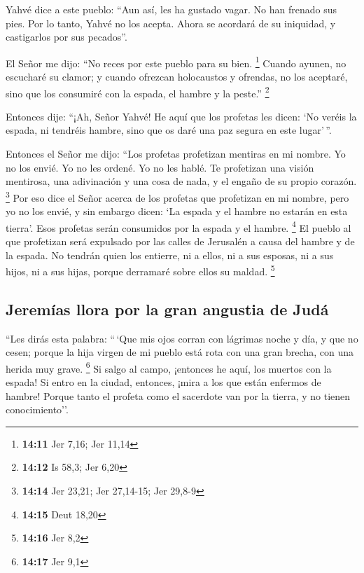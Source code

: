  Yahvé dice a este pueblo: ``Aun así, les ha gustado
vagar. No han frenado sus pies. Por lo tanto, Yahvé no los acepta. Ahora
se acordará de su iniquidad, y castigarlos por sus pecados''.

 El Señor me dijo: ``No reces por este pueblo para su
bien. \footnote{\textbf{14:11} Jer 7,16; Jer 11,14} 
Cuando ayunen, no escucharé su clamor; y cuando ofrezcan holocaustos y
ofrendas, no los aceptaré, sino que los consumiré con la espada, el
hambre y la peste.'' \footnote{\textbf{14:12} Is 58,3; Jer 6,20}

 Entonces dije: ``¡Ah, Señor Yahvé! He aquí que los
profetas les dicen: `No veréis la espada, ni tendréis hambre, sino que
os daré una paz segura en este lugar'\,''.

 Entonces el Señor me dijo: ``Los profetas profetizan
mentiras en mi nombre. Yo no los envié. Yo no les ordené. Yo no les
hablé. Te profetizan una visión mentirosa, una adivinación y una cosa de
nada, y el engaño de su propio corazón. \footnote{\textbf{14:14} Jer
  23,21; Jer 27,14-15; Jer 29,8-9}  Por eso dice el Señor
acerca de los profetas que profetizan en mi nombre, pero yo no los
envié, y sin embargo dicen: `La espada y el hambre no estarán en esta
tierra'. Esos profetas serán consumidos por la espada y el hambre.
\footnote{\textbf{14:15} Deut 18,20}  El pueblo al que
profetizan será expulsado por las calles de Jerusalén a causa del hambre
y de la espada. No tendrán quien los entierre, ni a ellos, ni a sus
esposas, ni a sus hijos, ni a sus hijas, porque derramaré sobre ellos su
maldad. \footnote{\textbf{14:16} Jer 8,2}

\hypertarget{jeremuxedas-llora-por-la-gran-angustia-de-juduxe1}{%
\subsection{Jeremías llora por la gran angustia de
Judá}\label{jeremuxedas-llora-por-la-gran-angustia-de-juduxe1}}

 ``Les dirás esta palabra: ``\,`Que mis ojos corran con
lágrimas noche y día, y que no cesen; porque la hija virgen de mi pueblo
está rota con una gran brecha, con una herida muy grave. \footnote{\textbf{14:17}
  Jer 9,1}  Si salgo al campo, ¡entonces he aquí, los
muertos con la espada! Si entro en la ciudad, entonces, ¡mira a los que
están enfermos de hambre! Porque tanto el profeta como el sacerdote van
por la tierra, y no tienen conocimiento''.

